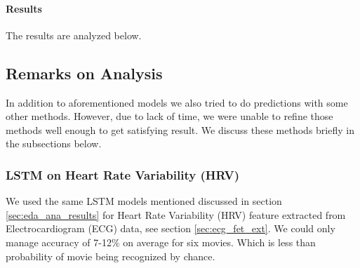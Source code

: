 \paragraph{Results} The results are analyzed below.
\begin{center}
\label{tab:shortlist_movies}
\end{center}

\subsection{Remarks on Analysis}
In addition to aforementioned models we also tried to do predictions with some other methods. However, due to lack of time, we were unable to refine those methods well enough to get satisfying result. We discuss these methods briefly in the subsections below.
\subsubsection{LSTM on Heart Rate Variability (HRV)} We used the same LSTM models mentioned discussed in section \ref{sec:eda_ana_results} for Heart Rate Variability (HRV) feature extracted from Electrocardiogram (ECG) data, see section \ref{sec:ecg_fet_ext}. We could only manage accuracy of 7-12\% on average for six movies. Which is less than probability of movie being recognized by chance.

